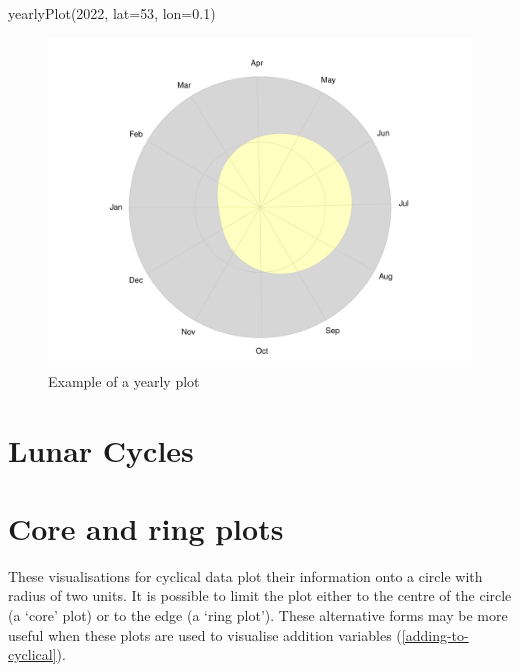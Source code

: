 \documentclass[
]{book}
\newenvironment{Shaded}{\begin{snugshade}}{\end{snugshade}}
\newcommand{\AttributeTok}[1]{\textcolor[rgb]{0.77,0.63,0.00}{#1}}
\newcommand{\DecValTok}[1]{\textcolor[rgb]{0.00,0.00,0.81}{#1}}
\newcommand{\FloatTok}[1]{\textcolor[rgb]{0.00,0.00,0.81}{#1}}
\newcommand{\FunctionTok}[1]{\textcolor[rgb]{0.00,0.00,0.00}{#1}}
\newcommand{\NormalTok}[1]{#1}
\begin{document}
\begin{Shaded}
\begin{Highlighting}[]
\FunctionTok{yearlyPlot}\NormalTok{(}\DecValTok{2022}\NormalTok{, }\AttributeTok{lat=}\DecValTok{53}\NormalTok{, }\AttributeTok{lon=}\FloatTok{0.1}\NormalTok{)}
\end{Highlighting}
\end{Shaded}

\begin{figure}

{\centering \includegraphics[width=0.9\linewidth]{_main_files/figure-latex/yearly-plot-1-1} 

}

\caption{Example of a yearly plot}\label{fig:yearly-plot-1}
\end{figure}

\hypertarget{lunar-cycles}{%
\section{Lunar Cycles}\label{lunar-cycles}}

\hypertarget{core-and-ring-plots}{%
\section{Core and ring plots}\label{core-and-ring-plots}}

These visualisations for cyclical data plot their information onto a circle with radius of two units. It is possible to limit the plot either to the centre of the circle (a `core' plot) or to the edge (a `ring plot'). These alternative forms may be more useful when these plots are used to visualise addition variables (\ref{adding-to-cyclical}).
\end{document}

